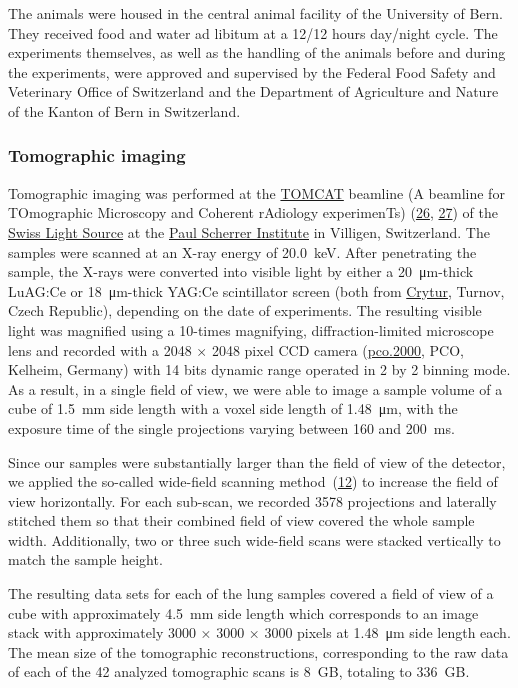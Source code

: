 \documentclass[
  american,
]{article}
\begin{document}
The animals were housed in the central animal facility of the University of Bern.
They received food and water ad libitum at a 12/12 hours day/night cycle.
The experiments themselves, as well as the handling of the animals before and during the experiments, were approved and supervised by the Federal Food Safety and Veterinary Office of Switzerland and the Department of Agriculture and Nature of the Kanton of Bern in Switzerland.

\hypertarget{tomographic-imaging}{%
\subsubsection{Tomographic imaging}\label{tomographic-imaging}}

Tomographic imaging was performed at the \href{https://www.psi.ch/sls/tomcat/}{TOMCAT} beamline (A beamline for TOmographic Microscopy and Coherent rAdiology experimenTs) (\protect\hyperlink{ref-knMAkPPz}{26}, \protect\hyperlink{ref-Cp0VRmEj}{27}) of the \href{https://www.psi.ch/sls/}{Swiss Light Source} at the \href{https://www.psi.ch/}{Paul Scherrer Institute} in Villigen, Switzerland.
The samples were scanned at an X-ray energy of 20.0~keV.
After penetrating the sample, the X-rays were converted into visible light by either a 20~μm-thick LuAG:Ce or 18~μm-thick YAG:Ce scintillator screen (both from \href{http://www.crytur.cz/}{Crytur}, Turnov, Czech Republic), depending on the date of experiments.
The resulting visible light was magnified using a 10-times magnifying, diffraction-limited microscope lens and recorded with a 2048 × 2048 pixel CCD camera (\href{https://www.pco.de/specialized-cameras/pco2000/}{pco.2000}, PCO, Kelheim, Germany) with 14 bits dynamic range operated in 2 by 2 binning mode.
As a result, in a single field of view, we were able to image a sample volume of a cube of 1.5~mm side length with a voxel side length of 1.48~μm, with the exposure time of the single projections varying between 160 and 200~ms.

Since our samples were substantially larger than the field of view of the detector, we applied the so-called wide-field scanning method~(\protect\hyperlink{ref-VELl7OiR}{12}) to increase the field of view horizontally.
For each sub-scan, we recorded 3578 projections and laterally stitched them so that their combined field of view covered the whole sample width.
Additionally, two or three such wide-field scans were stacked vertically to match the sample height.

The resulting data sets for each of the lung samples covered a field of view of a cube with approximately 4.5~mm side length which corresponds to an image stack with approximately 3000 × 3000 × 3000 pixels at 1.48~μm side length each.
The mean size of the tomographic reconstructions, corresponding to the raw data of each of the 42 analyzed tomographic scans is 8~GB, totaling to 336~GB.
\end{document}
